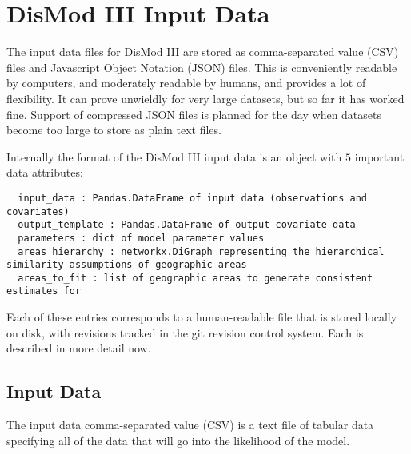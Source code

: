 \section{DisMod III Input Data}

The input data files for DisMod III are stored as comma-separated
value (CSV) files and Javascript Object Notation (JSON) files.  This
is conveniently readable by computers, and moderately readable by
humans, and provides a lot of flexibility.  It can prove unwieldly for
very large datasets, but so far it has worked fine.  Support of
compressed JSON files is planned for the day when datasets become too
large to store as plain text files.

Internally the format of the DisMod III input data is an object with $5$ important data attributes:
\begin{verbatim}
  input_data : Pandas.DataFrame of input data (observations and covariates)
  output_template : Pandas.DataFrame of output covariate data
  parameters : dict of model parameter values
  areas_hierarchy : networkx.DiGraph representing the hierarchical similarity assumptions of geographic areas
  areas_to_fit : list of geographic areas to generate consistent estimates for
\end{verbatim}

Each of these entries corresponds to a human-readable file that is
stored locally on disk, with revisions tracked in the git revision
control system.  Each is described in more detail now.

\subsection{Input Data}
The input data comma-separated value (CSV) is a text file of tabular
data specifying all of the data that will go into the likelihood of
the model.


